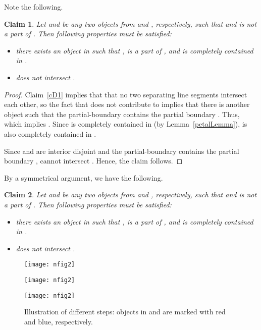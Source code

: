 \documentclass[a4paper,11pt]{article}
\newtheorem{claim}{Claim}
\begin{document}
Note the following.

\begin{claim}\label{cD3}
Let  and  be any two  objects from  and , respectively, such that
 and    is not a part of . Then  following properties must be satisfied:

\begin{itemize}
\item there exists an object  in  such that ,    is  a part of , and    is completely contained in .
\item  does not intersect .
\end{itemize}

\end{claim}
\begin{proof}
Claim~\ref{cD1} implies that that no two separating line segments intersect 
each other, {so the fact that  does not contribute to  implies that there is another object  such that the}
partial-boundary   contains the partial boundary 
.  Thus,  which implies .  Since   is completely contained in  (by Lemma~\ref{petalLemma}),  is also completely contained in .

Since  and  are interior disjoint and the
partial-boundary   contains the partial boundary 
,  cannot intersect .
Hence, the claim follows.
\end{proof}
{By a symmetrical argument,
we have the following.}
\begin{claim}\label{cD4}
Let  and  be any two  objects from  and , respectively, such that
 and    is not a part of . Then  following properties must be satisfied:

\begin{itemize}
\item there exists an object  in  such that ,    is  a part of , and    is completely contained in .
\item  does not intersect .

\end{itemize}

\end{claim}

\begin{figure}
    \centering
    \begin{minipage}{.3\linewidth}
        \centering
       \texttt{[image: nfig2]}
         \end{minipage}\begin{minipage}{0.3\linewidth}
        \centering
            \texttt{[image: nfig2]}
    \end{minipage}
      \begin{minipage}{0.3\linewidth}
        \centering
                   \texttt{[image: nfig2]}     
                              \end{minipage}
     \caption{Illustration of different steps: objects in  and  are marked with red and blue, respectively. }
      \label{fig_empty}
\end{figure}
\end{document}
